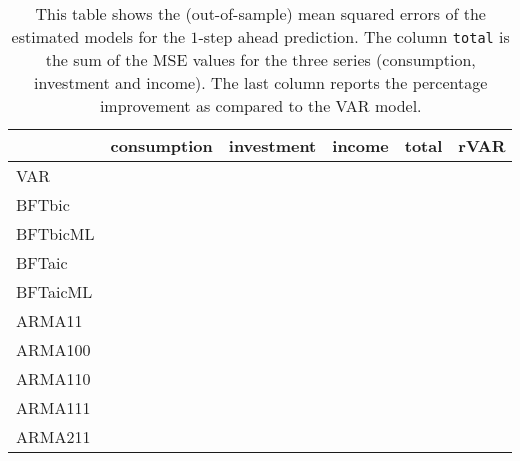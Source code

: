 \documentclass[]{article}
\begin{document}
\begin{table}

\caption{\label{tab:fCov2}This table shows the (out-of-sample) mean squared 
errors of the estimated models for the $1$-step ahead prediction. 
The column \texttt{total} is the sum of the MSE values for the 
three series (consumption, investment and income). The last column 
reports the percentage improvement as compared to the VAR model.}
\centering
\begin{tabular}[t]{lrrrrr}
\toprule
\textbf{ } & \textbf{consumption} & \textbf{investment} & \textbf{income} & \textbf{total} & \textbf{rVAR}\\
\midrule
VAR & \cellcolor{white}{0.283} & \cellcolor{white}{0.291} & \cellcolor{white}{1.006} & \cellcolor{white}{1.580} & \cellcolor{white}{0.0\%}\\
BFTbic & \cellcolor{white}{0.357} & \cellcolor{white}{0.348} & \cellcolor{white}{0.988} & \cellcolor{white}{1.693} & \cellcolor{white}{-7.1\%}\\
BFTbicML & \cellcolor{white}{0.308} & \cellcolor{white}{0.304} & \cellcolor{white}{0.989} & \cellcolor{white}{1.601} & \cellcolor{white}{-1.3\%}\\
BFTaic & \cellcolor[HTML]{90EE90}{0.247} & \cellcolor{white}{0.330} & \cellcolor{white}{1.017} & \cellcolor{white}{1.593} & \cellcolor{white}{-0.8\%}\\
BFTaicML & \cellcolor{white}{0.260} & \cellcolor{white}{0.299} & \cellcolor{white}{0.987} & \cellcolor[HTML]{90EE90}{1.546} & \cellcolor[HTML]{90EE90}{2.2\%}\\
ARMA11 & \cellcolor{white}{0.277} & \cellcolor{white}{0.458} & \cellcolor{white}{0.986} & \cellcolor{white}{1.721} & \cellcolor{white}{-8.9\%}\\
ARMA100 & \cellcolor{white}{0.281} & \cellcolor{white}{0.339} & \cellcolor{white}{1.006} & \cellcolor{white}{1.626} & \cellcolor{white}{-2.9\%}\\
ARMA110 & \cellcolor{white}{0.295} & \cellcolor[HTML]{90EE90}{0.277} & \cellcolor{white}{0.993} & \cellcolor{white}{1.565} & \cellcolor{white}{0.9\%}\\
ARMA111 & \cellcolor{white}{0.260} & \cellcolor{white}{0.300} & \cellcolor{white}{0.989} & \cellcolor{white}{1.549} & \cellcolor{white}{2.0\%}\\
ARMA211 & \cellcolor{white}{0.273} & \cellcolor{white}{0.355} & \cellcolor[HTML]{90EE90}{0.973} & \cellcolor{white}{1.601} & \cellcolor{white}{-1.3\%}\\
\bottomrule
\end{tabular}
\end{table}
\end{document}
